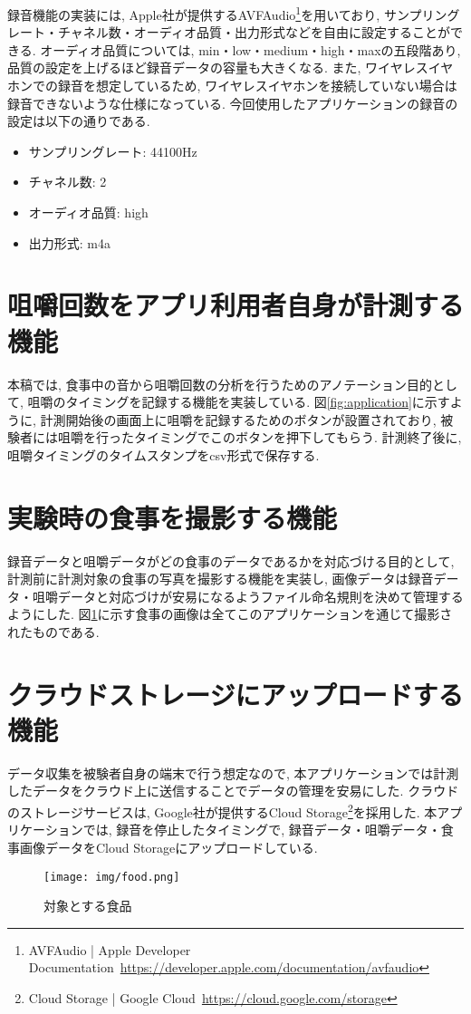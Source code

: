 録音機能の実装には, Apple社が提供するAVFAudio\footnote{AVFAudio | Apple Developer Documentation~\url{https://developer.apple.com/documentation/avfaudio}}を用いており, サンプリングレート・チャネル数・オーディオ品質・出力形式などを自由に設定することができる. オーディオ品質については, min・low・medium・high・maxの五段階あり, 品質の設定を上げるほど録音データの容量も大きくなる. また, ワイヤレスイヤホンでの録音を想定しているため, ワイヤレスイヤホンを接続していない場合は録音できないような仕様になっている. 今回使用したアプリケーションの録音の設定は以下の通りである.

\begin{itemize}
    \item サンプリングレート: 44100Hz
    \item チャネル数: 2
    \item オーディオ品質: high
    \item 出力形式: m4a
\end{itemize}

\section{咀嚼回数をアプリ利用者自身が計測する機能}

本稿では, 食事中の音から咀嚼回数の分析を行うためのアノテーション目的として, 咀嚼のタイミングを記録する機能を実装している. 図\ref{fig:application}に示すように, 計測開始後の画面上に咀嚼を記録するためのボタンが設置されており, 被験者には咀嚼を行ったタイミングでこのボタンを押下してもらう. 計測終了後に, 咀嚼タイミングのタイムスタンプをcsv形式で保存する.

\section{実験時の食事を撮影する機能}

録音データと咀嚼データがどの食事のデータであるかを対応づける目的として, 計測前に計測対象の食事の写真を撮影する機能を実装し, 画像データは録音データ・咀嚼データと対応づけが安易になるようファイル命名規則を決めて管理するようにした. 図\ref{fig:foods}に示す食事の画像は全てこのアプリケーションを通じて撮影されたものである.

\section{クラウドストレージにアップロードする機能}

データ収集を被験者自身の端末で行う想定なので, 本アプリケーションでは計測したデータをクラウド上に送信することでデータの管理を安易にした. クラウドのストレージサービスは, Google社が提供するCloud Storage\footnote{Cloud Storage | Google Cloud~\url{https://cloud.google.com/storage}}を採用した. 本アプリケーションでは, 録音を停止したタイミングで, 録音データ・咀嚼データ・食事画像データをCloud Storageにアップロードしている.

\begin{figure}[t]
    \begin{center}
        \texttt{[image: img/food.png]}
        \caption{対象とする食品}
        \label{fig:foods}
    \end{center}
\end{figure}



